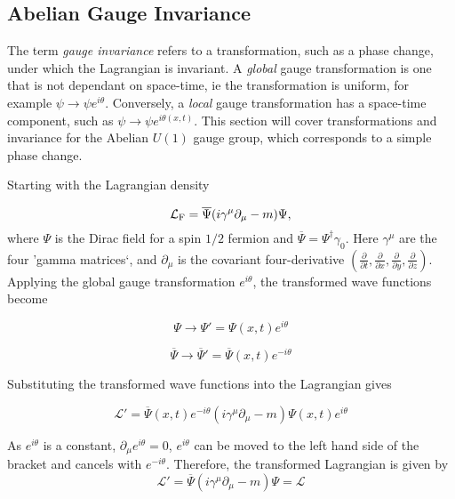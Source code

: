 \documentclass{article}
\begin{document}
\subsection{Abelian Gauge Invariance}%
\label{sec:SM_aGI}
The term \textit{gauge invariance} refers to a transformation, such as a phase change, under which the Lagrangian is invariant. A \textit{global} gauge transformation is one that is not dependant on space-time, ie the transformation is uniform, for example $\psi\rightarrow\psi e^{i\theta}$. Conversely, a \textit{local} gauge transformation has a space-time component, such as $\psi\rightarrow\psi e^{i\theta(x,t)}$. This section will cover transformations and invariance for the Abelian $U(1)$ gauge group, which corresponds to a simple phase change.

Starting with the Lagrangian density

\begin{equation}
\label{eqn:abelianLagrangian}
    \mathcal{L_{\rm{F}}} = \overline{\Psi} (i\gamma^\mu \partial_\mu - m)\Psi,
\end{equation}
where $\Psi$ is the Dirac field for a spin $1/2$ fermion and $\overline{\Psi} = \Psi^{\dagger}\gamma_{0}$. Here $\gamma^\mu$ are the four 'gamma matrices`, and $\partial_\mu$ is the covariant four-derivative $(\frac{\partial}{\partial t},\frac{\partial}{\partial x},\frac{\partial}{\partial y},\frac{\partial}{\partial z})$.
Applying the global gauge transformation $e^{i\theta}$, the transformed wave functions become

\begin{equation}
\label{eqn:abelianGlobalTransformation}
\Psi\rightarrow\Psi'=\Psi(x,t)e^{i\theta}
\end{equation}

\begin{equation}
\overline{\Psi}\rightarrow\overline{\Psi}'=\overline{\Psi}(x,t)e^{-i\theta}
\end{equation}

Substituting the transformed wave functions into the Lagrangian gives

\begin{equation}
\label{eqn:transformedLagrangianGlobalAbelian}
\mathcal{L'} = \overline{\Psi}(x,t)e^{-i\theta}(i\gamma^\mu \partial_\mu - m)\Psi(x,t)e^{i\theta}
\end{equation}

As $e^{i\theta}$ is a constant, $\partial_\mu e^{i\theta} = 0$, $e^{i\theta}$ can be moved to the left hand side of the bracket and cancels with $e^{-i\theta}$. Therefore, the transformed Lagrangian is given by
\begin{equation}
\mathcal{L'} = \overline{\Psi} (i\gamma^\mu \partial_\mu - m)\Psi = \mathcal{L}
\end{equation}
\end{document}
